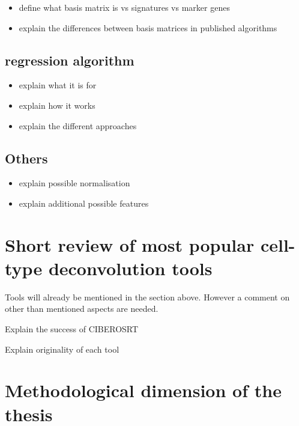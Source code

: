 \documentclass[12pt,]{book}
\providecommand{\tightlist}{%
  \setlength{\itemsep}{0pt}\setlength{\parskip}{0pt}}
\theoremstyle{definition}
\theoremstyle{definition}
\theoremstyle{definition}
\theoremstyle{remark}
\begin{document}
\begin{itemize}
\tightlist
\item
  define what basis matrix is vs signatures vs marker genes
\item
  explain the differences between basis matrices in published algorithms
\end{itemize}

\hypertarget{regression-algorithm}{%
\subsection{regression algorithm}\label{regression-algorithm}}

\begin{itemize}
\tightlist
\item
  explain what it is for
\item
  explain how it works
\item
  explain the different approaches
\end{itemize}

\hypertarget{others}{%
\subsection{Others}\label{others}}

\begin{itemize}
\tightlist
\item
  explain possible normalisation
\item
  explain additional possible features
\end{itemize}

\hypertarget{short-review-of-most-popular-cell-type-deconvolution-tools}{%
\section{Short review of most popular cell-type deconvolution
tools}\label{short-review-of-most-popular-cell-type-deconvolution-tools}}

Tools will already be mentioned in the section above. However a comment
on other than mentioned aspects are needed.

Explain the success of CIBEROSRT

Explain originality of each tool

\hypertarget{methodological-dimension-of-the-thesis}{%
\section{Methodological dimension of the
thesis}\label{methodological-dimension-of-the-thesis}}
\end{document}
